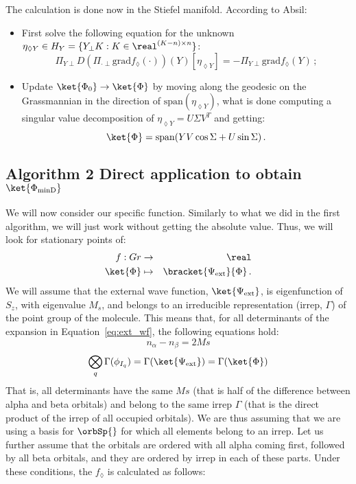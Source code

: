 \documentclass[a4paper,11pt]{article}
\newcommand{\irp}{\ensuremath{\Gamma}}
\begin{document}
The calculation is done now in the Stiefel manifold.
According to Absil:
\begin{itemize}
\item First solve the following equation for the unknown $\eta_{\lozenge Y} \in H_Y = \{Y_\perp K:K \in \real^{(K-n)\times n}\}$:
  \begin{equation}\label{eq:Absil_main_eq}
    \Pi_{Y\perp} D\left(\Pi_{\cdot{} \perp} \text{grad}f_\lozenge\left(\cdot{}\right) \right)
    \left(Y\right)\left[\eta_{\lozenge Y}\right] = -\Pi_{Y\perp}\text{grad}f_\lozenge\left(Y\right)\,;
  \end{equation}
\item Update $\ket{\Phi_0} \to \ket{\Phi}$ by moving along the geodesic on the Grassmannian in the direction of $\text{span}(\eta_{\lozenge Y})$, what is done computing a singular value decomposition of $\eta_{\lozenge Y} = U \Sigma V^T$ and getting:
  \begin{equation}
    \ket{\Phi} = \text{span}(Y V \cos \Sigma + U \sin \Sigma)\,.
  \end{equation}
\end{itemize}

\subsection{\textsf{\LARGE Algorithm 2}
  Direct application to obtain $\ket{\Phi_\text{minD}}$}
\label{sec:alg_two}

We will now consider our specific function.
Similarly to what we did in the first algorithm, we will just work without getting the absolute value.
Thus, we will look for stationary points of:
\begin{eqnarray}
  f : Gr &\to& \real\\
  \ket{\Phi} &\mapsto& \bracket{\Psi_\text{ext}}{\Phi}\,.
\end{eqnarray}
We will assume that the external wave function, $\ket{\Psi_\text{ext}}$, is eigenfunction of $S_z$, with eigenvalue $M_s$, and belongs to an irreducible representation (irrep, $\irp$) of the point group of the molecule.
This means that, for all determinants of the expansion in Equation~\eqref{eq:ext_wf}, the following equations hold:
\begin{equation}
  n_\alpha - n_\beta = 2 Ms
\end{equation}
\begin{equation}\label{eq:irrep_condition}
  \bigotimes_q \irp(\phi_{I_q}) = \irp(\ket{\Psi_\text{ext}}) = \irp(\ket{\Phi})
\end{equation}
That is, all determinants have the same $Ms$ (that is half of the difference between alpha and beta orbitals) and belong to the same irrep $\irp$ (that is the direct product of the irrep of all occupied orbitals).
We are thus assuming that we are using a basis for $\orbSp{}$ for which all elements belong to an irrep.
Let us further assume that the orbitals are ordered with all alpha coming first, followed by all beta orbitals, and they are ordered by irrep in each of these parts.
Under these conditions, the $f_\lozenge$ is calculated as follows:
\end{document}
